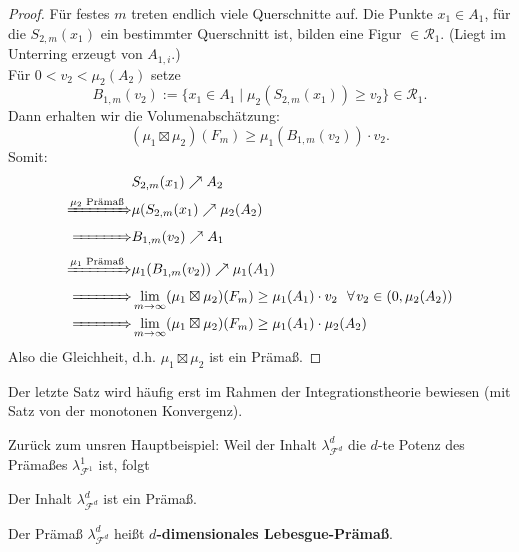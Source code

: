 \begin{satz}
\begin{proof}
Für festes $m$ treten endlich viele Querschnitte auf. Die Punkte $x_1 \in A_1$, für die $S_{2,m}(x_1)$ ein bestimmter Querschnitt ist, bilden eine Figur $\in \mathcal{R}_1$. (Liegt im Unterring erzeugt von $A_{1,i}$.) \\
Für $0<v_2<\mu_2(A_2)$ setze
$$
B_{1,m}(v_2) := \{x_1 \in A_1 \mid \mu_2(S_{2,m} (x_1) ) \geq v_2 \} \in \mathcal{R}_1.
$$
Dann erhalten wir die Volumenabschätzung:
$$(\mu_1 \boxtimes \mu_2) (F_m) \geq \mu_1 (B_{1,m}(v_2))\cdot v_2.$$
Somit:
\begin{equation*}
	\begin{split}
				&	S_{2,m}(x_1) \nearrow A_2	\\
			\xRightarrow{\mu_2 \text{ Prämaß}} & \mu(S_{2,m}(x_1) \nearrow \mu_2(A_2) \\
			\xRightarrow{\quad \quad\quad\  \,} & B_{1,m}(v_2) \nearrow A_1 \\
			\xRightarrow{\mu_1 \text{ Prämaß}} & \mu_1 (B_{1,m}(v_2)) \nearrow \mu_1(A_1) \\
			\xRightarrow{\quad \quad\quad\  \,} & \lim_{m \to \infty} (\mu_1 \boxtimes \mu_2) (F_m) \geq \mu_1(A_1) \cdot v_2\ \  \forall v_2 \in (0,\mu_2(A_2)) \\
			\xRightarrow{\quad \quad\quad\  \,} & \lim_{m \to \infty} (\mu_1 \boxtimes \mu_2) (F_m) \geq \mu_1(A_1) \cdot \mu_2(A_2) \\
	\end{split}
\end{equation*}
Also die Gleichheit, d.h. $\mu_1 \boxtimes \mu_2$ ist ein Prämaß.
\end{proof}
\end{satz}

\begin{remark}
Der letzte Satz wird häufig erst im Rahmen der Integrationstheorie bewiesen (mit Satz von der monotonen Konvergenz).
\end{remark}

Zurück zum unsren Hauptbeispiel: Weil der Inhalt $\lambda^d_{\mathcal{F}^d}$ die $d$-te Potenz des Prämaßes $\lambda^1_{\mathcal{F}^1}$ ist, folgt

\begin{korollar}
Der Inhalt $\lambda^d_{\mathcal{F}^d}$ ist ein Prämaß.
\end{korollar}

\begin{definition}
	\begin{mdframed} 
		Der Prämaß $\lambda^d_{\mathcal{F}^d}$ heißt \textbf{$d$-dimensionales Lebesgue-Prämaß}.
	\end{mdframed}
\end{definition}

